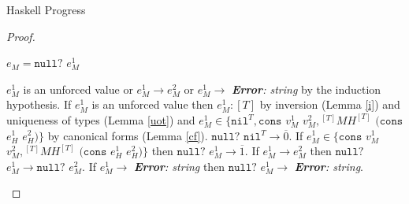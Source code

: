 \begin{theorem}{Haskell Progress}
\begin{proof}
\begin{case}
\end{case}


\begin{case}

$e_{M}=\mathtt{null?}$ $e_{M}^{1}$

$e_{M}^{1}$ is an unforced value or $e_{M}^{1}\rightarrow e_{M}^{2}$ or $e_{M}^{1}\rightarrow$ \emph{\textbf{Error}: string} by the induction hypothesis.  If $e_{M}^{1}$ is an unforced value then $e_{M}^{1}:[T]$ by inversion (Lemma \ref{i}) and uniqueness of types (Lemma \ref{uot}) and $e_{M}^{1}\in\lbrace\mathtt{nil}^{T},\mathtt{cons}$ $v_{M}^{1}$ $v_{M}^{2},{^{[T]}M}H^{[T]}$ $(\mathtt{cons}$ $e_{H}^{1}$ $e_{H}^{2})\rbrace$ by canonical forms (Lemma \ref{cf}).  $\mathtt{null?}$ $\mathtt{nil}^{T}\rightarrow\overline{0}$.  If $e_{M}^{1}\in\lbrace\mathtt{cons}$ $v_{M}^{1}$ $v_{M}^{2},{^{[T]}M}H^{[T]}$ $(\mathtt{cons}$ $e_{H}^{1}$ $e_{H}^{2})\rbrace$ then $\mathtt{null?}$ $e_{M}^{1}\rightarrow\overline{1}$.  If $e_{M}^{1}\rightarrow e_{M}^{2}$ then $\mathtt{null?}$ $e_{M}^{1}\rightarrow\mathtt{null?}$ $e_{M}^{2}$.  If $e_{M}^{1}\rightarrow$ \emph{\textbf{Error}: string} then $\mathtt{null?}$ $e_{M}^{1}\rightarrow$ \emph{\textbf{Error}: string}.

\end{case}

\end{proof}

\end{theorem}
